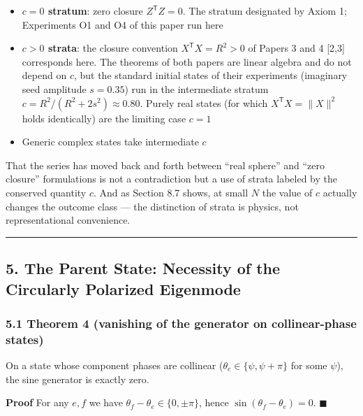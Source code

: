 \documentclass[
  a4paper,
]{article}
\providecommand{\tightlist}{%
  \setlength{\itemsep}{0pt}\setlength{\parskip}{0pt}}
\begin{document}
\begin{itemize}
\tightlist
\item
  \textbf{\(c=0\) stratum}: zero closure \(Z^{\mathsf T}Z=0\). The
  stratum designated by Axiom 1; Experiments O1 and O4 of this paper run
  here
\item
  \textbf{\(c>0\) strata}: the closure convention
  \(X^{\mathsf T}X=R^2>0\) of Papers 3 and 4 {[}2,3{]} corresponds here.
  The theorems of both papers are linear algebra and do not depend on
  \(c\), but the standard initial states of their experiments (imaginary
  seed amplitude \(s=0.35\)) run in the intermediate stratum
  \(c=R^2/(R^2+2s^2)\approx0.80\). Purely real states (for which
  \(X^{\mathsf T}X=\lVert X\rVert^2\) holds identically) are the
  limiting case \(c=1\)
\item
  Generic complex states take intermediate \(c\)
\end{itemize}

That the series has moved back and forth between ``real sphere'' and
``zero closure'' formulations is not a contradiction but a use of strata
labeled by the conserved quantity \(c\). And as Section 8.7 shows, at
small \(N\) the value of \(c\) actually changes the outcome class ---
the distinction of strata is physics, not representational convenience.

\begin{center}\rule{0.5\linewidth}{0.5pt}\end{center}

\subsection{5. The Parent State: Necessity of the Circularly Polarized
Eigenmode}\label{the-parent-state-necessity-of-the-circularly-polarized-eigenmode}

\subsubsection{5.1 Theorem 4 (vanishing of the generator on
collinear-phase
states)}\label{theorem-4-vanishing-of-the-generator-on-collinear-phase-states}

On a state whose component phases are collinear
(\(\theta_e\in\{\psi,\psi+\pi\}\) for some \(\psi\)), the sine generator
is exactly zero.

\textbf{Proof} For any \(e,f\) we have
\(\theta_f-\theta_e\in\{0,\pm\pi\}\), hence
\(\sin(\theta_f-\theta_e)=0\). \(\blacksquare\)
\end{document}

